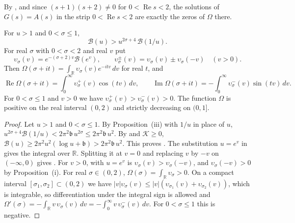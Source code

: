 By , and since $(s+1)(s+2)\ne0$ for $0<\operatorname{Re}s<2$, the solutions of $G(s)=A(s)$ in the strip $0<\operatorname{Re}s<2$ are exactly the zeros of $\Omega$ there.

\begin{proposition}\label{prop:Binv}
For $u>1$ and $0<\sigma\le1$,
\begin{equation}\label{eq:Binv}
\mathcal B(u)>u^{2\sigma+4}\,\mathcal B(1/u) .
\end{equation}
For real $\sigma$ with $0<\sigma<2$ and real $v$ put
\begin{equation}\label{eq:upsilon}
\upsilon_\sigma(v)=e^{-(\sigma+2)v}\mathcal B(e^v),\qquad\upsilon_\sigma^\pm(v)=\upsilon_\sigma(v)\pm\upsilon_\sigma(-v)\quad(v>0).
\end{equation}
Then $\Omega(\sigma+it)=\int_{\mathbb R}\upsilon_\sigma(v)e^{-itv}\,dv$ for real $t$, and
\begin{equation}\label{eq:ReImOmega}
\operatorname{Re}\Omega(\sigma+it)=\int_0^\infty\upsilon^+_\sigma(v)\cos(tv)\,dv,\qquad\operatorname{Im}\Omega(\sigma+it)=-\int_0^\infty\upsilon^-_\sigma(v)\sin(tv)\,dv .
\end{equation}
For $0<\sigma\le1$ and $v>0$ we have $\upsilon^+_\sigma(v)>\upsilon^-_\sigma(v)>0$. The function $\Omega$ is positive on the real interval $(0,2)$ and strictly decreasing on $(0,1]$.
\end{proposition}

\begin{proof}
Let $u>1$ and $0<\sigma\le1$. By Proposition~\textup{(iii)} with $1/u$ in place of $u$, $u^{2\sigma+4}\mathcal B(1/u)<2\pi^2\mathfrak b\,u^{2\sigma}\le2\pi^2\mathfrak b\,u^2$. By  and $\mathcal K\ge0$, $\mathcal B(u)\ge2\pi^2u^2(\log u+\mathfrak b)>2\pi^2\mathfrak b\,u^2$. This proves . The substitution $u=e^v$ in  gives the integral over $\mathbb R$. Splitting it at $v=0$ and replacing $v$ by $-v$ on $(-\infty,0)$ gives . For $v>0$,  with $u=e^v$ is $\upsilon_\sigma(v)>\upsilon_\sigma(-v)$, and $\upsilon_\sigma(-v)>0$ by Proposition~\textup{(i)}. For real $\sigma\in(0,2)$, $\Omega(\sigma)=\int_{\mathbb R}\upsilon_\sigma>0$. On a compact interval $[\sigma_1,\sigma_2]\subset(0,2)$ we have $|v|\upsilon_\sigma(v)\le|v|(\upsilon_{\sigma_1}(v)+\upsilon_{\sigma_2}(v))$, which is integrable, so differentiation under the integral sign is allowed and $\Omega'(\sigma)=-\int_{\mathbb R}v\,\upsilon_\sigma(v)\,dv=-\int_0^\infty v\,\upsilon^-_\sigma(v)\,dv$. For $0<\sigma\le1$ this is negative.
\end{proof}

